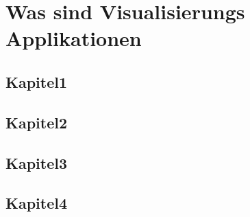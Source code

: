\chapter{Was sind Visualisierungs Applikationen}
\section{Kapitel1}
\section{Kapitel2}
\section{Kapitel3}
\section{Kapitel4}